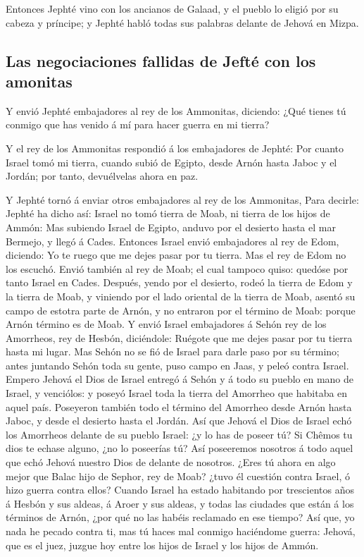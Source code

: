  Entonces Jephté vino con los ancianos de Galaad, y el
pueblo lo eligió por su cabeza y príncipe; y Jephté habló todas sus
palabras delante de Jehová en Mizpa.

\hypertarget{las-negociaciones-fallidas-de-jeftuxe9-con-los-amonitas}{%
\subsection{Las negociaciones fallidas de Jefté con los
amonitas}\label{las-negociaciones-fallidas-de-jeftuxe9-con-los-amonitas}}

 Y envió Jephté embajadores al rey de los Ammonitas,
diciendo: ¿Qué tienes tú conmigo que has venido á mí para hacer guerra
en mi tierra?

 Y el rey de los Ammonitas respondió á los embajadores de
Jephté: Por cuanto Israel tomó mi tierra, cuando subió de Egipto, desde
Arnón hasta Jaboc y el Jordán; por tanto, devuélvelas ahora en paz.

 Y Jephté tornó á enviar otros embajadores al rey de los
Ammonitas,  Para decirle: Jephté ha dicho así: Israel no
tomó tierra de Moab, ni tierra de los hijos de Ammón:  Mas
subiendo Israel de Egipto, anduvo por el desierto hasta el mar Bermejo,
y llegó á Cades.  Entonces Israel envió embajadores al rey
de Edom, diciendo: Yo te ruego que me dejes pasar por tu tierra. Mas el
rey de Edom no los escuchó. Envió también al rey de Moab; el cual
tampoco quiso: quedóse por tanto Israel en Cades.  Después,
yendo por el desierto, rodeó la tierra de Edom y la tierra de Moab, y
viniendo por el lado oriental de la tierra de Moab, asentó su campo de
estotra parte de Arnón, y no entraron por el término de Moab: porque
Arnón término es de Moab.  Y envió Israel embajadores á
Sehón rey de los Amorrheos, rey de Hesbón, diciéndole: Ruégote que me
dejes pasar por tu tierra hasta mi lugar.  Mas Sehón no se
fió de Israel para darle paso por su término; antes juntando Sehón toda
su gente, puso campo en Jaas, y peleó contra Israel. 
Empero Jehová el Dios de Israel entregó á Sehón y á todo su pueblo en
mano de Israel, y venciólos: y poseyó Israel toda la tierra del Amorrheo
que habitaba en aquel país.  Poseyeron también todo el
término del Amorrheo desde Arnón hasta Jaboc, y desde el desierto hasta
el Jordán.  Así que Jehová el Dios de Israel echó los
Amorrheos delante de su pueblo Israel: ¿y lo has de poseer tú?
 Si Chêmos tu dios te echase alguno, ¿no lo poseerías tú?
Así poseeremos nosotros á todo aquel que echó Jehová nuestro Dios de
delante de nosotros.  ¿Eres tú ahora en algo mejor que
Balac hijo de Sephor, rey de Moab? ¿tuvo él cuestión contra Israel, ó
hizo guerra contra ellos?  Cuando Israel ha estado
habitando por trescientos años á Hesbón y sus aldeas, á Aroer y sus
aldeas, y todas las ciudades que están á los términos de Arnón, ¿por qué
no las habéis reclamado en ese tiempo?  Así que, yo nada he
pecado contra ti, mas tú haces mal conmigo haciéndome guerra: Jehová,
que es el juez, juzgue hoy entre los hijos de Israel y los hijos de
Ammón.

